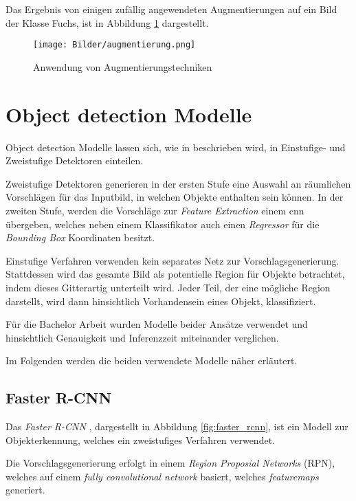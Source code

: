 Das Ergebnis von einigen zufällig angewendeten Augmentierungen 
auf ein Bild der Klasse Fuchs, ist
in Abbildung \ref{fig:augmentierung} dargestellt.

\begin{figure}[H]
    \centering
    \texttt{[image: Bilder/augmentierung.png]}
    \caption{Anwendung von Augmentierungstechniken}
    \label{fig:augmentierung}
\end{figure}


\section{Object detection Modelle}

Object detection Modelle lassen sich, wie in 
\cite{wuRecentAdvancesDeep2019} beschrieben wird,
in Einstufige- und Zweistufige Detektoren einteilen.

Zweistufige Detektoren generieren in der 
ersten Stufe eine Auswahl an räumlichen Vorschlägen
für das Inputbild, in welchen Objekte enthalten sein 
können. 
In der zweiten Stufe, werden die Vorschläge zur \textit{Feature 
Extraction} einem \Gls{cnn} übergeben, welches neben 
einem Klassifikator auch einen \textit{Regressor} für 
die \textit{Bounding Box} Koordinaten besitzt.

Einstufige Verfahren verwenden kein separates 
Netz zur Vorschlagsgenerierung. Stattdessen 
wird das gesamte Bild als potentielle
Region für Objekte betrachtet, indem 
dieses Gitterartig unterteilt wird.
Jeder Teil, der eine mögliche Region darstellt, 
wird dann hinsichtlich Vorhandensein 
eines Objekt, klassifiziert.

Für die Bachelor Arbeit wurden 
Modelle beider Ansätze verwendet und 
hinsichtlich Genauigkeit und 
Inferenzzeit miteinander verglichen.

Im Folgenden werden die beiden 
verwendete Modelle näher erläutert.


\subsection*{Faster R-CNN}

Das \textit{Faster R-CNN} \cite{renFasterRCNNRealTime2016a}, 
dargestellt in Abbildung \ref{fig:faster_rcnn}, 
ist ein Modell zur Objekterkennung, welches
ein zweistufiges Verfahren verwendet.

Die Vorschlagsgenerierung erfolgt in einem 
\textit{Region Proposial Networks} (RPN), welches auf 
einem \textit{fully convolutional network} 
basiert, welches \textit{\Glspl{featuremap}} generiert.

